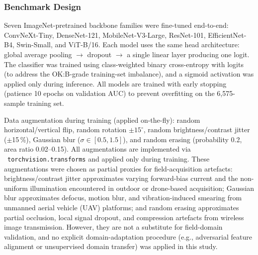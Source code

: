 \documentclass[conference]{IEEEtran}
\begin{document}
\subsubsection{Benchmark Design}
Seven ImageNet-pretrained backbone families were fine-tuned end-to-end: ConvNeXt-Tiny, DenseNet-121, MobileNet-V3-Large, ResNet-101, EfficientNet-B4, Swin-Small, and ViT-B/16. Each model uses the same head architecture: global average pooling $\to$ dropout $\to$ a single linear layer producing one logit. The classifier was trained using class-weighted binary cross-entropy with logits (to address the OK:B-grade training-set imbalance), and a sigmoid activation was applied only during inference. All models are trained with early stopping (patience 10 epochs on validation AUC) to prevent overfitting on the 6{,}575-sample training set.

Data augmentation during training (applied on-the-fly): random horizontal/vertical flip, random rotation $\pm15^\circ$, random brightness/contrast jitter ($\pm$15\,\%), Gaussian blur ($\sigma \in [0.5, 1.5]$), and random erasing (probability 0.2, area ratio 0.02--0.15). All augmentations are implemented via \ \texttt{torchvision.transforms} and applied only during training.
These augmentations were chosen as partial proxies for field-acquisition artefacts: brightness/contrast jitter approximates varying forward-bias current and the non-uniform illumination encountered in outdoor or drone-based acquisition; Gaussian blur approximates defocus, motion blur, and vibration-induced smearing from unmanned aerial vehicle (UAV) platforms; and random erasing approximates partial occlusion, local signal dropout, and compression artefacts from wireless image transmission. However, they are not a substitute for field-domain validation, and no explicit domain-adaptation procedure (e.g., adversarial feature alignment or unsupervised domain transfer) was applied in this study.
\end{document}

